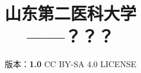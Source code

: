 

\title{%
    {\Huge\textbf{山东第二医科大学\\[5pt]——？？？}}
}
\author{%
    版本：\textbf{1.0} \qquad%
    CC BY-SA 4.0 LICENSE \qquad%
    }
\date{\CurrentCustomTime}
\maketitle

\renewcommand{\thefootnote}{\arabic{footnote}}
